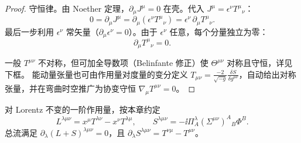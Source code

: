 \begin{proof}
守恒律。由 Noether 定理，$\partial_\mu J^\mu=0$ 在壳。代入 $J^\mu=\epsilon^\nu T^\mu{}_\nu$：
\begin{equation*}
0=\partial_\mu J^\mu=\partial_\mu(\epsilon^\nu T^\mu{}_\nu)=\epsilon^\nu\,\partial_\mu T^\mu{}_\nu.
\end{equation*}
最后一步利用 $\epsilon^\nu$ 常矢量（$\partial_\mu\epsilon^\nu=0$）。由于 $\epsilon^\nu$ 任意，每个分量独立为零：
\begin{equation}\label{eq:ms-poincare-T-conservation}
{\partial_\mu T^\mu{}_\nu=0.}
\end{equation}

一般 $T^{\mu\nu}$ 不对称，但可加全导数项（Belinfante 修正）使 $\Theta^{\mu\nu}$ 对称且守恒，详见下框。
能动量张量也可由作用量对度量的变分定义 $T_{\mu\nu}=\frac{-2}{\sqrt{-g}}\frac{\delta S}{\delta g^{\mu\nu}}$，自动给出对称张量，并在弯曲时空推广为协变守恒 $\nabla_\mu T^{\mu\nu}=0$。
\end{proof}

\begin{proposition}
对 Lorentz 不变的一阶作用量，按本章约定\[L^{\lambda\mu\nu}=x^\mu T^{\lambda\nu}-x^\nu T^{\lambda\mu},\qquad S^{\lambda\mu\nu}=-\ii\Pi_A^\lambda(\Sigma^{\mu\nu})^A{}_B\Phi^B.\]总流满足 $\partial_\lambda(L+S)^{\lambda\mu\nu}=0$，且 $\partial_\lambda S^{\lambda\mu\nu}=T^{\nu\mu}-T^{\mu\nu}$。
\end{proposition}

